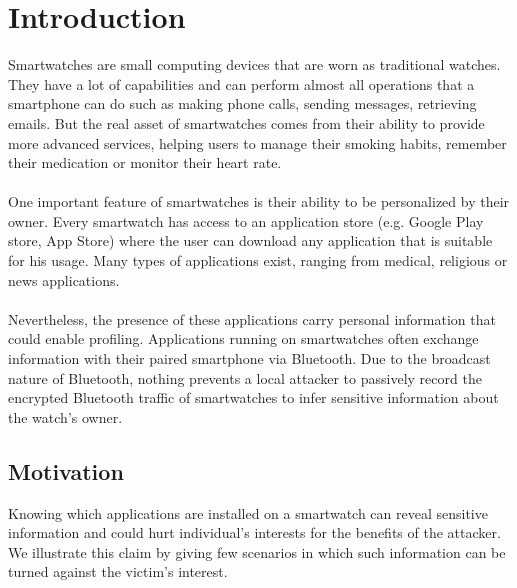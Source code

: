 \chapter{Introduction}
\label{chap:Introduction}
Smartwatches are small computing devices that are worn as traditional watches. They have a lot of capabilities and can perform almost all operations that a smartphone can do such as making phone calls, sending messages, retrieving emails. But the real asset of smartwatches comes from their ability to provide more advanced services, helping users to manage their smoking habits, remember their medication or monitor their heart rate. 
\\
\\
One important feature of smartwatches is their ability to be personalized by their owner. Every smartwatch has access to an application store (e.g.  Google Play store, App Store) where the user can download any application that is suitable for his usage. Many types of applications exist, ranging from medical, religious or news applications.
\\
\\
Nevertheless, the presence of these applications carry personal information that could enable profiling. Applications running on smartwatches often exchange information with their paired smartphone via Bluetooth. Due to the broadcast nature of Bluetooth, nothing prevents a local attacker to passively record the encrypted Bluetooth traffic of smartwatches to infer sensitive information about the watch's owner.


\section{Motivation}

Knowing which applications are installed on a smartwatch can reveal sensitive information and could hurt individual’s interests for the benefits of the attacker. We illustrate this claim by giving few scenarios in which such information can be turned against the victim's interest. 


